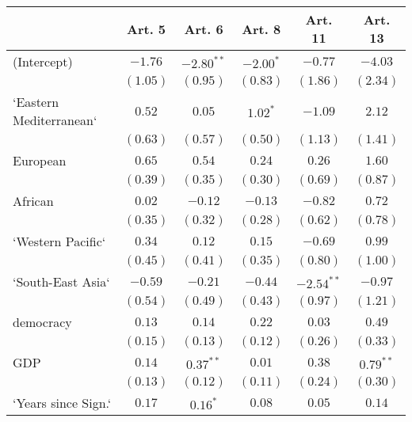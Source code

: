 
\begin{table}[!h]
\begin{center}
\begin{tabular}{l c c c c c }
\toprule
 & Art. 5 & Art. 6 & Art. 8 & Art. 11 & Art. 13 \\
\midrule
(Intercept)             & $-1.76$      & $-2.80^{**}$ & $-2.00^{*}$  & $-0.77$      & $-4.03$      \\
                        & $(1.05)$     & $(0.95)$     & $(0.83)$     & $(1.86)$     & $(2.34)$     \\
`Eastern Mediterranean` & $0.52$       & $0.05$       & $1.02^{*}$   & $-1.09$      & $2.12$       \\
                        & $(0.63)$     & $(0.57)$     & $(0.50)$     & $(1.13)$     & $(1.41)$     \\
European                & $0.65$       & $0.54$       & $0.24$       & $0.26$       & $1.60$       \\
                        & $(0.39)$     & $(0.35)$     & $(0.30)$     & $(0.69)$     & $(0.87)$     \\
African                 & $0.02$       & $-0.12$      & $-0.13$      & $-0.82$      & $0.72$       \\
                        & $(0.35)$     & $(0.32)$     & $(0.28)$     & $(0.62)$     & $(0.78)$     \\
`Western Pacific`       & $0.34$       & $0.12$       & $0.15$       & $-0.69$      & $0.99$       \\
                        & $(0.45)$     & $(0.41)$     & $(0.35)$     & $(0.80)$     & $(1.00)$     \\
`South-East Asia`       & $-0.59$      & $-0.21$      & $-0.44$      & $-2.54^{**}$ & $-0.97$      \\
                        & $(0.54)$     & $(0.49)$     & $(0.43)$     & $(0.97)$     & $(1.21)$     \\
democracy               & $0.13$       & $0.14$       & $0.22$       & $0.03$       & $0.49$       \\
                        & $(0.15)$     & $(0.13)$     & $(0.12)$     & $(0.26)$     & $(0.33)$     \\
GDP                     & $0.14$       & $0.37^{**}$  & $0.01$       & $0.38$       & $0.79^{**}$  \\
                        & $(0.13)$     & $(0.12)$     & $(0.11)$     & $(0.24)$     & $(0.30)$     \\
`Years since Sign.`     & $0.17$       & $0.16^{*}$   & $0.08$       & $0.05$       & $0.14$       \\

\end{tabular}
\end{center}
\end{table}
